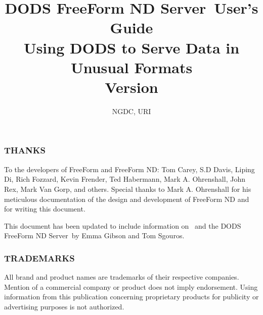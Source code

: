 \documentclass{dods-book}
\newcommand{\DOCversion}{Version \rcsInfoRevision}
\newcommand{\ffs}{DODS FreeForm ND Server}
\begin{document}
\title{\ffs\ User's Guide\\Using DODS to Serve Data in Unusual Formats
\\\DOCversion}  
\author{NGDC, URI}
\date{\rcsInfoDate}
\maketitle

\W{}

\W

\subsubsection{THANKS}

To the developers of FreeForm and FreeForm ND: Tom Carey, S.D Davis,
Liping Di, Rich Fozzard, Kevin Frender, Ted Habermann, Mark A.
Ohrenshall, John Rex, Mark Van Gorp, and others. Special thanks to
Mark A. Ohrenshall for his meticulous documentation of the design and
development of FreeForm ND and for writing this document.

This document has been updated to include information on \ffnd\ 
and the \ffs\ by Emma Gibson and Tom Sgouros.

\subsubsection{TRADEMARKS}

All brand and product names are trademarks of their respective
companies. Mention of a commercial company or product does not imply
endorsement. Using information from this publication concerning
proprietary products for publicity or advertising purposes is not
authorized.

\T

\tableofcontents
\listoffigures
\listoftables

\clearemptydoublepage





\end{document}
